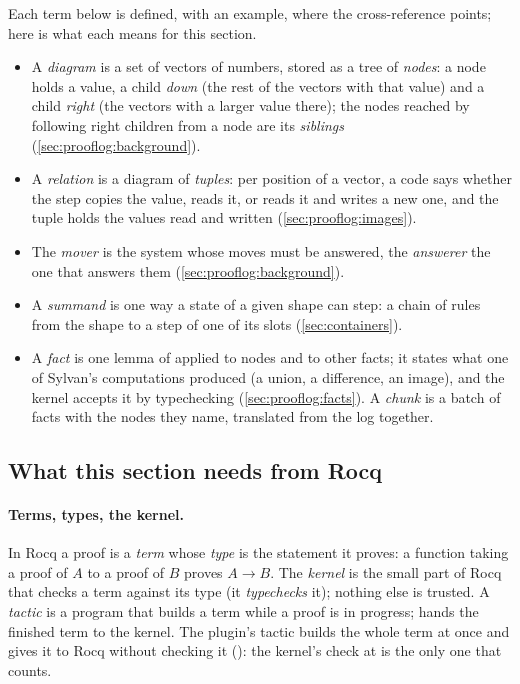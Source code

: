 Each term below is defined, with an example, where the cross-reference
points; here is what each means for this section.
\begin{itemize}
\item A \emph{diagram} is a set of vectors of numbers, stored as a tree of
  \emph{nodes}: a node holds a value, a child \emph{down} (the rest of the
  vectors with that value) and a child \emph{right} (the vectors with a
  larger value there); the nodes reached by following right children
  from a node are its \emph{siblings} (\cref{sec:prooflog:background}).
\item A \emph{relation} is a diagram of \emph{tuples}: per position of a
  vector, a code says whether the step copies the value, reads it, or
  reads it and writes a new one, and the tuple holds the values read and
  written (\cref{sec:prooflog:images}).
\item The \emph{mover} is the system whose moves must be answered, the
  \emph{answerer} the one that answers them
  (\cref{sec:prooflog:background}).
\item A \emph{summand} is one way a state of a given shape can step: a
  chain of rules from the shape to a step of one of its slots
  (\cref{sec:containers}).
\item A \emph{fact} is one lemma of  applied to
  nodes and to other facts; it states what one of Sylvan's computations
  produced (a union, a difference, an image), and the kernel accepts it
  by typechecking (\cref{sec:prooflog:facts}). A \emph{chunk} is a batch
  of facts with the nodes they name, translated from the log together.
\end{itemize}

\subsection{What this section needs from Rocq}\label{sec:qed:rocq}

\paragraph{Terms, types, the kernel.} In Rocq a proof is a \emph{term}
whose \emph{type} is the statement it proves: a function taking a proof
of $A$ to a proof of $B$ proves $A \to B$. The \emph{kernel} is the small
part of Rocq that checks a term against its type (it \emph{typechecks}
it); nothing else is trusted. A \emph{tactic} is a program that builds
a term while a proof is in progress;  hands the finished term
to the kernel. The plugin's tactic builds the whole term at once and
gives it to Rocq without checking it (): the
kernel's check at  is the only one that counts.

